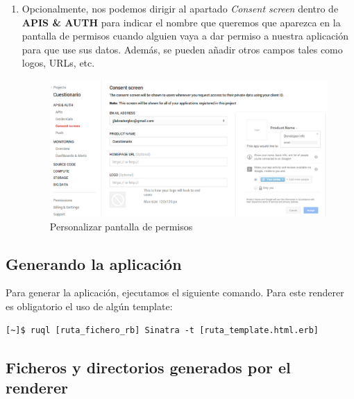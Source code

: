 \begin{enumerate}
  \item Opcionalmente, nos podemos dirigir al apartado \textit{Consent screen} dentro de {\bfseries APIS \& AUTH} para indicar el nombre que queremos que aparezca
  en la pantalla de permisos cuando alguien vaya a dar permiso a nuestra aplicaci\'on para que use sus datos. Adem\'as, se pueden a\~{n}adir otros campos tales como
  logos, URLs, etc.
  \begin{figure}[!th]
  \begin{center}
  \includegraphics[width=1.2\textwidth]{images/gdc6.eps}
  \caption{Personalizar pantalla de permisos}
  \label{fig:gdc6}
  \end{center}
  \end{figure}
  
\end{enumerate}
\newpage

\subsection{Generando la aplicaci\'on}
\label{subsec:Apendice2.14}

Para generar la aplicaci\'on, ejecutamos el siguiente comando. Para este renderer es obligatorio el uso de alg\'un template:
\begin{verbatim}
[~]$ ruql [ruta_fichero_rb] Sinatra -t [ruta_template.html.erb]
\end{verbatim}

\subsection{Ficheros y directorios generados por el renderer}
\label{subsec:Apendice2.15}

